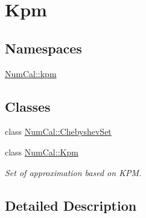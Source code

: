 \hypertarget{group__kpm}{\section{Kpm}
\label{group__kpm}
}
\subsection*{Namespaces}
\begin{DoxyCompactItemize}
\item 
 \hyperlink{namespaceNumCal_1_1kpm}{Num\+Cal\+::kpm}
\end{DoxyCompactItemize}
\subsection*{Classes}
\begin{DoxyCompactItemize}
\item 
class \hyperlink{classNumCal_1_1ChebyshevSet}{Num\+Cal\+::\+Chebyshev\+Set}
\item 
class \hyperlink{classNumCal_1_1Kpm}{Num\+Cal\+::\+Kpm}
\begin{DoxyCompactList}\small\item\em Set of approximation based on K\+P\+M. \end{DoxyCompactList}\end{DoxyCompactItemize}


\subsection{Detailed Description}
